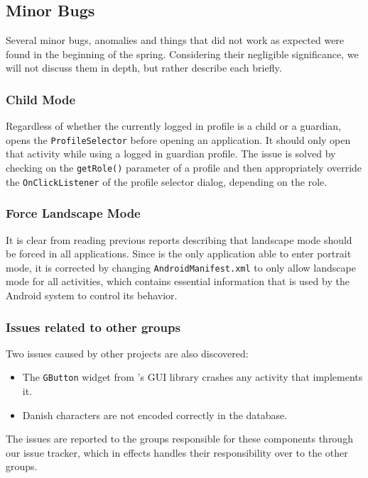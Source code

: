 \subsection{Minor Bugs}

Several minor bugs, anomalies and things that did not work as expected were found in the beginning of the spring.
Considering their negligible significance, we will not discuss them in depth, but rather describe each briefly.

\subsubsection{Child Mode}
Regardless of whether the currently logged in profile is a child or a guardian, \launcher opens the \lstinline{ProfileSelector} before opening an application.
It should only open that activity while using a logged in guardian profile.
The issue is solved by checking on the \lstinline{getRole()} parameter of a profile and then appropriately override the \lstinline{OnClickListener} of the profile selector dialog, depending on the role. 

\subsubsection{Force Landscape Mode}
It is clear from reading previous reports describing \launcher that landscape mode should be forced in all \giraf applications.
Since \launcher is the only application able to enter portrait mode, it is corrected by changing \lstinline{AndroidManifest.xml} to only allow landscape mode for all activities, which contains essential information that is used by the Android system to control its behavior\cite{appManifest}.

\subsubsection{Issues related to other groups}
Two issues caused by other projects are also discovered:

\begin{itemize}
\item The \lstinline{GButton} widget from \giraf's GUI library crashes any activity that implements it.
\item Danish characters are not encoded correctly in the database.
\end{itemize}

The issues are reported to the groups responsible for these components through our issue tracker, which in effects handles their responsibility over to the other groups.